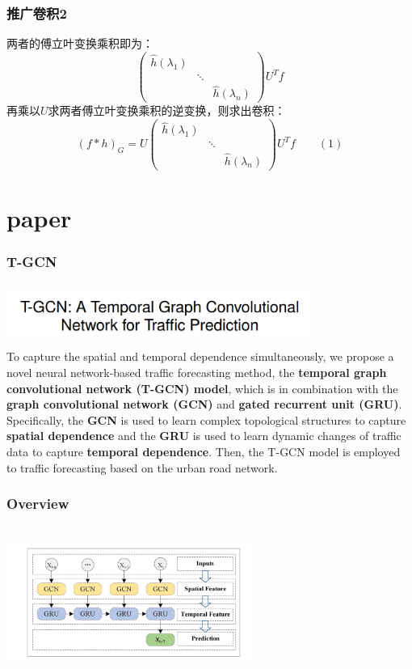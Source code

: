 \documentclass{beamer}
\begin{document}
\begin{frame}
    \frametitle{推广卷积2}
    两者的傅立叶变换乘积即为：
    $$\left(\begin{matrix}\hat h(\lambda_1) & \\&\ddots \\ &&\hat h(\lambda_n) \end{matrix}\right)U^Tf$$
    再乘以$U$求两者傅立叶变换乘积的逆变换，则求出卷积：\\
    $$(f*h)_G= U\left(\begin{matrix}\hat h(\lambda_1) & \\&\ddots \\ &&\hat h(\lambda_n) \end{matrix}\right) U^Tf \qquad(1)$$

\end{frame}

\section{paper}

\begin{frame}
    \frametitle{T-GCN}
    \includegraphics[height=2cm, width=10cm]{images/paper.png}\\
    To capture the spatial and temporal dependence simultaneously, we propose a novel neural network-based traffic forecasting method, the \textbf{temporal graph convolutional network (T-GCN) model}, which is in combination with the \textbf{graph convolutional network (GCN)} and \textbf{gated recurrent unit (GRU)}. Specifically, the \textbf{GCN} is used to learn complex topological structures to capture \textbf{spatial dependence} and the \textbf{GRU} is used to learn dynamic changes of traffic data to capture \textbf{temporal dependence}. Then, the T-GCN model is employed to traffic forecasting based on the urban road network.

\end{frame}

\begin{frame}
    \frametitle{Overview}
    \includegraphics[height=5cm, width=8cm]{images/overview.png}\\


\end{frame}
\end{document}
